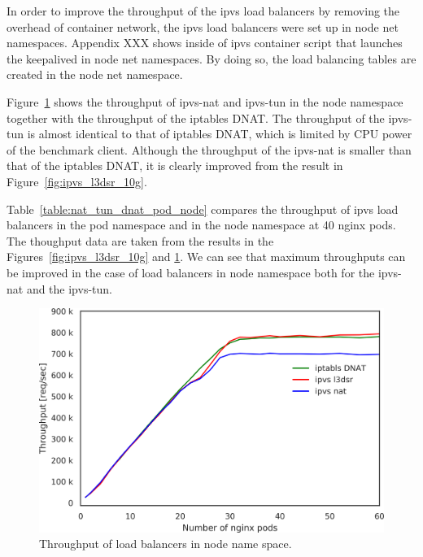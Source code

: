 In order to improve the throughput of the ipvs load balancers by removing the overhead of container network, the ipvs load balancers were set up in node net namespaces.
Appendix XXX shows inside of ipvs container script that launches the keepalived in node net namespaces.
By doing so, the load balancing tables are created in the node net namespace.

Figure~\ref{fig:ipvs_node_l3dsr_10g} shows the throughput of ipvs-nat and ipvs-tun in the node namespace together with the throughput of the iptables DNAT.
The throughput of the ipvs-tun is almost identical to that of iptables DNAT, which is limited by CPU power of the benchmark client. 
%
Although the throughput of the ipvs-nat is smaller than that of the iptables DNAT, it is clearly improved from the result in Figure~\ref{fig:ipvs_l3dsr_10g}.

Table~\ref{table:nat_tun_dnat_pod_node} compares the throughput of ipvs load balancers in the pod namespace and in the node namespace at 40 nginx pods.
The thoughput data are taken from the results in the Figures~\ref{fig:ipvs_l3dsr_10g} and \ref{fig:ipvs_node_l3dsr_10g}.
We can see that maximum throughputs can be improved in the case of load balancers in node namespace both for the ipvs-nat and the ipvs-tun.  

\begin{figure}[h]
  \centering
  \includegraphics[width=0.8\columnwidth]{Figs/ipvs_node_l3dsr_10g}
  \caption{Throughput of load balancers in node name space.}
  \label{fig:ipvs_node_l3dsr_10g}
\end{figure}

